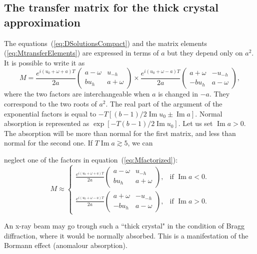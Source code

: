 \documentclass[preprint]{iucr}              %
\newcommand{\inred}[1]{{\color{red}#1}}
\begin{document}

\subsection{The transfer matrix for the thick crystal approximation}
\label{sec:Mthick}

The equations~(\ref{eq:DSolutionsCompact}) and the matrix elements (\ref{eq:MtransferElements}) are expressed in terms of $a$ but they depend only on $a^2$.
It is possible to write it as 
\begin{equation}\label{eq:Mfactorized}
    M =
    \frac{e^{i(u_0+\omega+a)T}}{2a}
    \begin{pmatrix}
    a-\omega & u_{-h}\\
    b u_h & a + \omega
    \end{pmatrix}
    \times 
    \frac{e^{i(u_0+\omega-a)T}}{2a}
    \begin{pmatrix}
    a+\omega & -u_{-h}\\
    -b u_h & a - \omega
    \end{pmatrix}, 
\end{equation}
where the two \inred{factors} are interchangeable when $a$ is changed in $-a$. They correspond to the two roots of $a^2$. The real part of the argument of the exponential factors is equal to $-T[(b-1)/2 \operatorname{Im} u_0 \pm \operatorname{Im} a]$. Normal absorption is represented as $\exp[-T(b-1)/2 \operatorname{Im} u_0]$. Let us set $\operatorname{Im}a>0$. The absorption will be more than normal for the first matrix, and less than normal for the second one. If $T \operatorname{Im}a  \gtrsim 5$, we can \inred{neglect one of the factors in equation~(\ref{eq:Mfactorized}): \begin{equation}\label{eq:Mthickapprox}
    M \approx \begin{cases} 
    \frac{e^{i(u_0+\omega+a)T}}{2a}
    \begin{pmatrix}
    a-\omega & u_{-h}\\
    b u_h & a + \omega
    \end{pmatrix}, & \text{if $\operatorname{Im}a<0$}.\\
    
    \frac{e^{i(u_0+\omega-a)T}}{2a}
    \begin{pmatrix}
    a+\omega & -u_{-h}\\
    -b u_h & a - \omega
    \end{pmatrix}, & \text{if $\operatorname{Im}a>0$}.
    \end{cases}
\end{equation} 

An x-ray beam may go trough such a ``thick crystal" in the condition of Bragg diffraction, where it would be normally absorbed. This is a manifestation of the Bormann effect (anomalour absorption).
}
\end{document}
